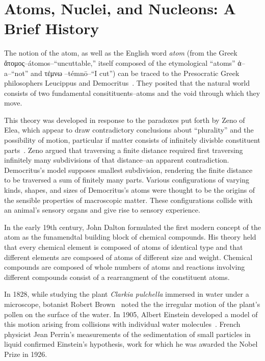 \section{Atoms, Nuclei, and Nucleons: A Brief History}

The notion of the atom, as well as the English word \textit{atom}
(from the Greek \textgreek{ἄτομος}--átomos--``uncuttable,''
itself composed of the etymological ``atoms''
\textgreek{ἀ}--a--``not''
and
\textgreek{τέμνω }--témnō--``I cut'') can be traced to the Presocratic Greek
philosophers Leucippus and Democritus~\cite{sep-atomism-ancient}.
They posited that the natural world consists of two fundamental
consitituents--atoms and the void through which they move.


This theory was developed in response to the paradoxes put forth by Zeno of
Elea, which appear to draw contradictory conclusions about ``plurality'' and
the possibility of motion, particular if matter consists of infinitely divisble
constituent parts~\cite{sep-paradox-zeno}.
Zeno argued that traversing a finite distance required first traversing
infinitely many subdivisions of that distance--an apparent contradiction.
Democritus's model supposes smallest subdivision, rendering the finite distance
to be traversed a sum of finitely many parts.
Various configurations of varying kinds, shapes, and sizes of Democritus's
atoms were thought to be the origins of the sensible properties of macroscopic
matter.
These configurations collide with an animal's sensory organs and give rise to
sensory experience.


In the early 19th century, John Dalton formulated the first modern concept of
the atom as the funamendtal building block of chemical compounds.
His theory held that every chemical element is composed of atoms of identical
type and that different elements are composed of atoms of different size and
weight.
Chemical compounds are composed of whole numbers of atoms and reactions
involving different compounds consist of a rearrangment of the constituent
atoms.


In 1828, while studying the plant \textit{Clarkia pulchella} immersed in water
under a microscope,
botanist Robert Brown~\cite{Brown_1828} noted the
the irregular motion of the plant's pollen on the surface of the water.
In 1905, Albert Einstein developed a model of this motion  arising from
collisions with individual water molecules~\cite{Einstein_1905}.
French physicist Jean Perrin's measurements of the sedimentation of small
particles in liquid confirmed Einstein's hypothesis, work for which he was
awarded the Nobel Prize in 1926.

